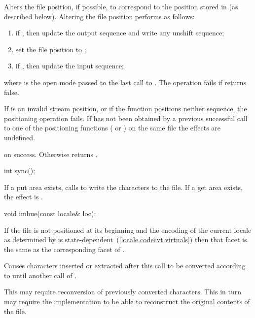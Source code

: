 \begin{itemdescr}
\pnum
Alters the file position, if possible, to correspond to the position
stored in  (as described below).
Altering the file position performs as follows:
\begin{enumerate}
\item
if
,
then update the output sequence and
write any unshift sequence;
\item
set the file position to ;
\item
if
,
then update the input sequence;
\end{enumerate}
where  is the open mode passed to the last call to
.
The operation fails if
returns false.

\pnum
If  is an invalid stream position, or if the function positions
neither sequence, the positioning operation fails.
If  has not been obtained by a previous successful call to one of
the positioning functions
(
or
)
on the same file the effects are undefined.

\pnum
\returns
{}
on success.
Otherwise returns
.
\end{itemdescr}

%
\begin{itemdecl}
int sync();
\end{itemdecl}

\begin{itemdescr}
\pnum
\effects
If a put area exists, calls
to write the characters to the file.
If a get area exists, the effect is .
\end{itemdescr}

%
\begin{itemdecl}
void imbue(const locale& loc);
\end{itemdecl}

\begin{itemdescr}
\pnum
\precondition
If the file is not positioned at its beginning and the encoding of the current
locale as determined by
is state-dependent~(\ref{locale.codecvt.virtuals})
then that facet is the same as
the corresponding facet of .

\pnum
\effects
Causes characters inserted or extracted after this call
to be converted according to  until another call of
.

\pnum
\note
This may require reconversion of previously converted characters.
This in turn may require the implementation to be able to reconstruct
the original contents of the file.
\end{itemdescr}

